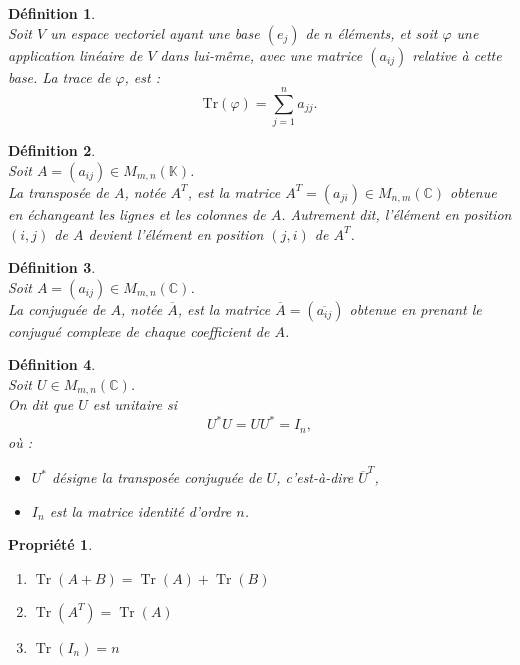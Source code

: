 \documentclass[a4paper, 14pt]{report}
\newtheorem{definition}{Définition}[section]
\newtheorem{propriety}{Propriété}[section]
\begin{document}
\begin{onehalfspace}
{\begin{definition} \cite{serre1971representation} \\
Soit \( V \) un espace vectoriel ayant une base \( (e_j) \) de \( n \) éléments, et soit \( \varphi \) une application linéaire de \( V \) dans lui-même, avec une matrice \( (a_{ij}) \) relative à cette base. La trace de \( \varphi \), est :
	\[
	\text{Tr}(\varphi) = \sum_{j=1}^{n} a_{jj}.
	\]
\end{definition}

\begin{definition} \cite{harville1997trace} \\
Soit \( A = (a_{ij}) \in M_{m,n}(\mathbb{K}) \).\\
La transposée de \( A \), notée \( A^T \), est la matrice \( A^T = (a_{ji}) \in M_{n,m}(\mathbb{C}) \) obtenue en échangeant les lignes et les colonnes de \( A \).
Autrement dit, l'élément en position \( (i,j) \) de \( A \) devient l'élément en position \( (j,i) \) de \( A^T \).
\end{definition}

\begin{definition} \cite{harville1997trace}\\
Soit \( A = (a_{ij}) \in M_{m,n}(\mathbb{C}) \).\\
La conjuguée de \( A \), notée \( \overline{A} \), est la matrice \( \overline{A} = (\overline{a_{ij}}) \) obtenue en prenant le conjugué complexe de chaque coefficient de \( A \).
\end{definition}

\begin{definition} \cite{serre1971representation} \\
Soit \( U \in M_{m,n}(\mathbb{C}) \). \\ 
On dit que \( U \) est unitaire si 
	\[
	U^* U = U U^* = I_n,
	\]
	où :
	\begin{itemize}
		\item \( U^* \) désigne la transposée conjuguée de \( U \), c'est-à-dire \( \overline{U}^T \),
		\item \( I_n \) est la matrice identité d'ordre \( n \).
	\end{itemize}
\end{definition}


\begin{propriety} \cite{harville1997trace}
	\begin{enumerate}
		\item  \(\operatorname{Tr}(A+B)=\operatorname{Tr}(A)+\operatorname{Tr}(B)\)
		\item \( \operatorname{Tr}(A^{T})=\operatorname{Tr}(A)\)
		\item \(\operatorname{Tr}(I_{n})=n\)
		

\end{enumerate}
\end{propriety}}
\end{onehalfspace}
\end{document}
